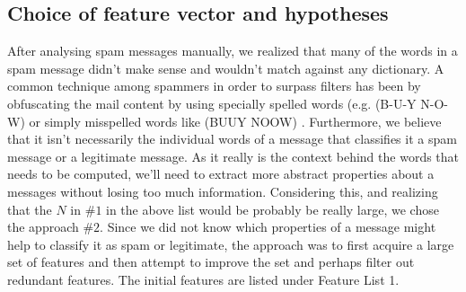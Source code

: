 \subsection{Choice of feature vector and hypotheses}
After analysing spam messages manually, we realized that many of the
words in a spam message didn't make sense and wouldn't match against any
dictionary. A common technique among spammers in order to surpass
filters has been by obfuscating the mail content by using specially spelled
words (e.g. (B-U-Y N-O-W) or simply misspelled words like (BUUY NOOW)
\cite{machine-learning-methods-spam}. Furthermore, we believe that it isn't
necessarily the individual words of a message that classifies it a spam message
or a legitimate message. As it really is the context behind the words that
needs to be computed, we'll need to extract more abstract properties about a
messages without losing too much information.
Considering this, and realizing that the $N$ in \#$1$ in the above
list would be probably be really large, we chose the approach \#$2$. Since we
did not know which properties of a message might help to classify it as spam or
legitimate, the approach was to first acquire a large set of features and then
attempt to improve the set and perhaps filter out redundant features. The
initial features are listed under Feature List 1. 

